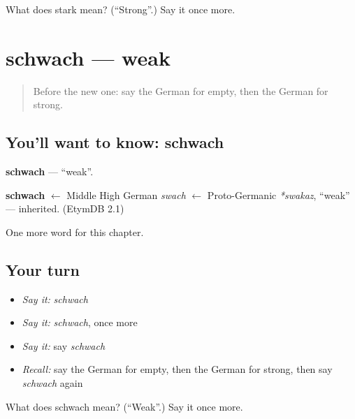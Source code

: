 \begin{tcolorbox}[breakable,colback=teal!4,colframe=teal!35!black,title={Before you move on}]
What does stark mean? (\textquotedblleft{}Strong\textquotedblright{}.) Say it once more.
\end{tcolorbox}
\section[schwach]{schwach — weak}

\label{lesson:GE-C91-schwach}



\begin{quote}
Before the new one: say the German for empty, then the German for strong.
\end{quote}

\subsection*{You'll want to know: schwach}
\textbf{schwach} — \textquotedblleft{}weak\textquotedblright{}.

\begin{cousinweb}
\textbf{schwach} $\leftarrow$ Middle High German \emph{swach} $\leftarrow$ Proto-Germanic \emph{*swakaz}, \textquotedblleft{}weak\textquotedblright{} — inherited. (EtymDB 2.1)
\end{cousinweb}

\begin{grammarlens}[title={What you've built}]
One more word for this chapter.
\end{grammarlens}

\subsection*{Your turn}
\begin{itemize}
\raggedright
  \item \emph{Say it:} \emph{schwach}
  \item \emph{Say it:} \emph{schwach}, once more
  \item \emph{Say it:} say \emph{schwach}
  \item \emph{Recall:} say the German for empty, then the German for strong, then say \emph{schwach} again
\end{itemize}

\begin{tcolorbox}[breakable,colback=teal!4,colframe=teal!35!black,title={Before you move on}]
What does schwach mean? (\textquotedblleft{}Weak\textquotedblright{}.) Say it once more.
\end{tcolorbox}
